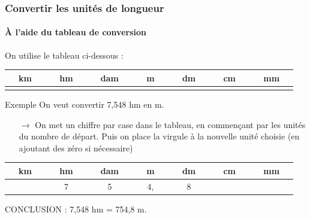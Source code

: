 \documentclass[xcolor=table]{beamer}
\begin{document}
\begin{frame}
	\frametitle{Convertir les unités de longueur}  
	\framesubtitle{À l'aide du tableau de conversion}	
	
	On utilise le tableau ci-dessous :
		\begin{small}
		\begin{center}
			\begin{tabular}{|c|c|c|c|c|c|c|}	
				\hline
					\rowcolor{gray} ~~\textbf{km}~~    &    ~~\textbf{hm}~~ &    ~~\textbf{dam}~~ & ~~\textbf{m}~~ & ~~\textbf{dm}~~ & 	~~\textbf{cm}~~ & ~~\textbf{mm}~~ \\
				\hline
					& & & & & & \\
				\hline	
			\end{tabular}	\pause
		\end{center}
		\end{small}

	
	\begin{block}{Exemple}
		On veut convertir 7,548 hm en m.
		\begin{itemize}
			\item[$\rightarrow$] On met un chiffre par case dans le tableau, en commençant par les unités du nombre de départ. Puis on place la virgule à la nouvelle unité choisie (en ajoutant des zéro si nécessaire)
		\end{itemize}
		
		\begin{small}		
		\begin{center}
			\begin{tabular}{|c|c|c|c|c|c|c|}	
				\hline
				\rowcolor{gray} ~~\textbf{km}~~    &    ~~\textbf{hm}~~ &    ~~\textbf{dam}~~ & ~~\textbf{m}~~ & ~~\textbf{dm}~~ & 	~~\textbf{cm}~~ & ~~\textbf{mm}~~ \\
				\hline
					& 7 & 5 & 4, & 8 & & \\
				\hline	
			\end{tabular}	
		\end{center}
		\end{small}
		
		CONCLUSION : 7,548 hm = 754,8 m.
	\end{block}
	
	
\end{frame}
\end{document}
